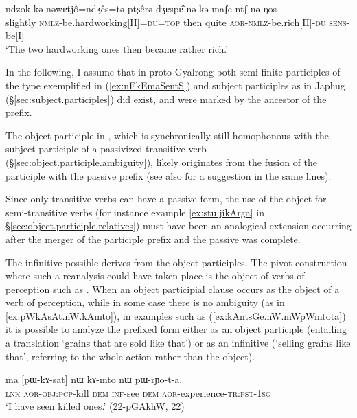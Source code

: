 \begin{exe}
\ex \label{ex:nEkEmaSentS} 
\gll  ndzok kǝ-nǝwɐtjô=ndʒês=tǝ ptʂêrǝ dʒɐspɐ̂ nǝ-kǝ-maʃe-ntʃ nǝ-ŋos \\
slightly \textsc{nmlz}-be.hardworking[II]=\textsc{du}=\textsc{top} then quite \textsc{aor}-\textsc{nmlz}-be.rich[II]-\textsc{du} \textsc{sens}-be[I] \\
\glt `The two hardworking ones then became rather rich.' \citep[193--194]{lin09phd}
\end{exe}

In the following, I assume that in proto-Gyalrong both semi-finite participles of the type exemplified in (\ref{ex:nEkEmaSentS}) and subject participles as in Japhug (§\ref{sec:subject.participles}) did exist, and were marked by the ancestor of the  prefix.

The object participle in , which is synchronically still homophonous with the subject participle of a passivized transitive verb (§\ref{sec:object.participle.ambiguity}), likely originates from the fusion of the  participle with the passive  prefix (see also \citealt{jackson06guanxiju, jacksonlin07} for a suggestion in the same lines).

Since only transitive verbs can have a passive form, the use of the object for semi-transitive verbs (for instance example \ref{ex:stu.jikArga} in §\ref{sec:object.participle.relatives}) must have been an analogical extension occurring after the merger of the participle prefix and the passive was complete. 

The  infinitive possible derives from the object participles. The pivot construction where such a reanalysis could have taken place is the object of verbs of perception such as . When an object participial clause occurs as the object of a verb of perception, while in some case there is no ambiguity (as in \ref{ex:pWkAsAt.nW.kAmto}), in examples such as (\ref{ex:kAntsGe.nW.mWpWmtota}) it is possible to analyze the  prefixed form either as an object participle (entailing a translation `grains that are sold like that') or as an infinitive (`selling grains like that', referring to the whole action rather than the object).

\begin{exe}
\ex \label{ex:pWkAsAt.nW.kAmto} 
\gll ma [pɯ-kɤ-sat] nɯ kɤ-mto nɯ pɯ-rɲo-t-a. \\
\textsc{lnk} \textsc{aor}-\textsc{obj}:\textsc{pcp}-kill \textsc{dem} \textsc{inf}-see \textsc{dem} \textsc{aor}-experience-\textsc{tr}:\textsc{pst}-\textsc{1sg} \\
\glt `I have seen killed ones.' (22-pGAkhW, 22)
\end{exe}

